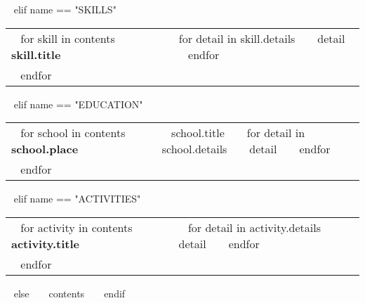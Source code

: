 \begin{minipage}{\textwidth}
~{ elif name == "SKILLS" }~
  \begin{tabular}{ @{} p{32mm} p{135mm} @{} }
  ~{ for skill in contents }~
    \bf\small ~{{ skill.title }}~ & {\small
    ~{ for detail in skill.details }~
        ~{{ detail }}~
    ~{ endfor }~
    } \\
  ~{ endfor }~
  \end{tabular}
  \vspace{10mm}

~{ elif name == "EDUCATION" }~
  \begin{tabular}{ @{} p{32mm} p{135mm} @{} }
  ~{ for school in contents }~
    \bf\small ~{{ school.place }}~ & {\small
    ~{{ school.title }}~
    ~{ for detail in school.details }~
        ~{{ detail }}~
    ~{ endfor }~
    } \\
  ~{ endfor }~
  \end{tabular}
  \vspace{10mm}

~{ elif name == "ACTIVITIES" }~
  \begin{tabular}{ @{} p{32mm} p{135mm} @{} }
  ~{ for activity in contents }~
    \bf\small ~{{ activity.title }}~ & {\small
    ~{ for detail in activity.details }~
        ~{{ detail }}~
    ~{ endfor }~
    } \\
  ~{ endfor }~
  \end{tabular}
  \vspace{10mm}

~{ else }~
  ~{{ contents }}~
  \bigskip
~{ endif }~
\end{minipage}
